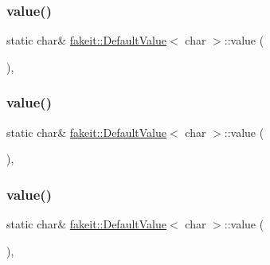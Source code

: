 \subsubsection{\texorpdfstring{value()}{value()}\hspace{0.1cm}{\footnotesize\ttfamily [1/9]}}
{\footnotesize\ttfamily static char\& \mbox{\hyperlink{structfakeit_1_1DefaultValue}{fakeit\+::\+Default\+Value}}$<$ char $>$\+::value (\begin{DoxyParamCaption}{ }\end{DoxyParamCaption})\hspace{0.3cm}{\ttfamily [inline]}, {\ttfamily [static]}}

\mbox{\label{structfakeit_1_1DefaultValue_3_01char_01_4_ab19dfe44819ef26af2d403500d420968}} 
\subsubsection{\texorpdfstring{value()}{value()}\hspace{0.1cm}{\footnotesize\ttfamily [2/9]}}
{\footnotesize\ttfamily static char\& \mbox{\hyperlink{structfakeit_1_1DefaultValue}{fakeit\+::\+Default\+Value}}$<$ char $>$\+::value (\begin{DoxyParamCaption}{ }\end{DoxyParamCaption})\hspace{0.3cm}{\ttfamily [inline]}, {\ttfamily [static]}}

\mbox{\label{structfakeit_1_1DefaultValue_3_01char_01_4_ab19dfe44819ef26af2d403500d420968}} 
\subsubsection{\texorpdfstring{value()}{value()}\hspace{0.1cm}{\footnotesize\ttfamily [3/9]}}
{\footnotesize\ttfamily static char\& \mbox{\hyperlink{structfakeit_1_1DefaultValue}{fakeit\+::\+Default\+Value}}$<$ char $>$\+::value (\begin{DoxyParamCaption}{ }\end{DoxyParamCaption})\hspace{0.3cm}{\ttfamily [inline]}, {\ttfamily [static]}}

